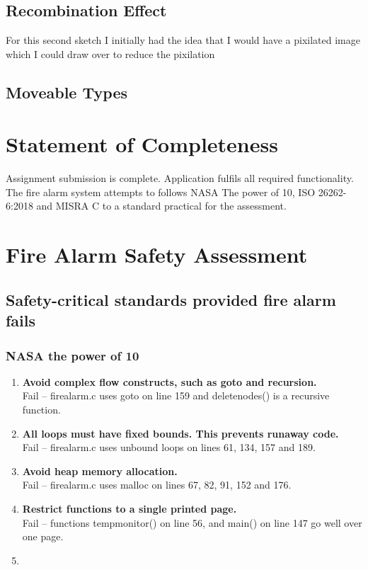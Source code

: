 \documentclass[12pt,a4paper]{article}
\begin{document}
		\subsection{Recombination Effect}
			For this second sketch I initially had the idea that I would have a pixilated image which 
			I could draw over to reduce the pixilation 

		\subsection{Moveable Types}
	
	\section{Statement of Completeness}
		Assignment submission is complete. Application fulfils all required functionality. 
		The fire alarm system attempts to follows NASA The power of 10, ISO 26262-6:2018
		and MISRA C to a standard practical for the assessment.
	
	\section{Fire Alarm Safety Assessment}
		\subsection{Safety-critical standards provided fire alarm fails}
			\subsubsection{NASA the power of 10}
				\begin{enumerate}
					\item\textbf{Avoid complex flow constructs, such as goto and recursion.}\\Fail – firealarm.c uses goto on line 159 and deletenodes() is a recursive function.
					\item\textbf{All loops must have fixed bounds. This prevents runaway code.}\\Fail – firealarm.c uses unbound loops on lines 61, 134, 157 and 189.
					\item\textbf{Avoid heap memory allocation.}\\Fail – firealarm.c uses malloc on lines 67, 82, 91, 152 and 176.
					\item\textbf{Restrict functions to a single printed page.}\\Fail – functions tempmonitor() on line 56, and main() on line 147 go well over one page.
					\item\textbf{}
				\end{enumerate}
\end{document}
